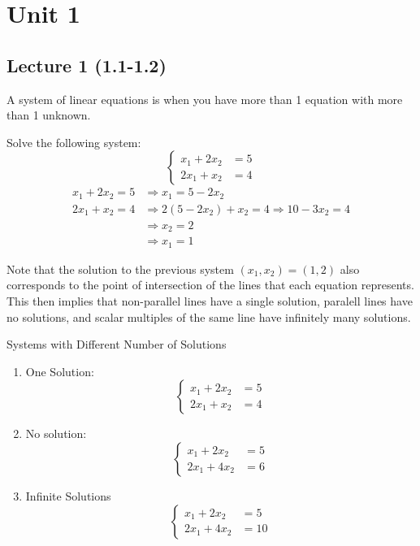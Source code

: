 \section{Unit 1}
\subsection{Lecture 1 (1.1-1.2)}

A system of linear equations is when you have more than 1 equation with more than 1 unknown.

\begin{example}{}{}
    Solve the following system:
    \[
        \begin{cases}
            x_1 + 2x_2 &= 5 \\
            2x_1 + x_2 &= 4
        \end{cases}
    \]
    \begin{align*}
        x_1 + 2x_2 = 5 &\Rightarrow x_1 = 5-2x_2 \\
        2x_1 + x_2 = 4 &\Rightarrow 2(5-2x_2) + x_2 = 4 \Rightarrow 10-3x_2=4 \\ 
        &\Rightarrow x_2=2 \\
        &\Rightarrow x_1 = 1
    \end{align*}
\end{example}

Note that the solution to the previous system $(x_1, x_2) = (1, 2)$ also corresponds to the point of intersection of the lines that each equation represents. This then implies that non-parallel lines have a single solution, paralell lines have no solutions, and scalar multiples of the same line have infinitely many solutions.

\begin{example}{Systems with Different Number of Solutions}{}
    \begin{enumerate}
        \item One Solution:
        \[
            \begin{cases}
                x_1 + 2x_2 &= 5 \\
                2x_1 + x_2 &= 4
            \end{cases} 
        \]

        \item No solution:
        \[
            \begin{cases}
                x_1 + 2x_2 &= 5 \\
                2x_1 + 4x_2 &= 6
            \end{cases}
        \]

        \item Infinite Solutions
        \[
            \begin{cases}
                x_1 + 2x_2 &= 5 \\
                2x_1 + 4x_2 &= 10
            \end{cases}
        \]
    \end{enumerate}
\end{example}

